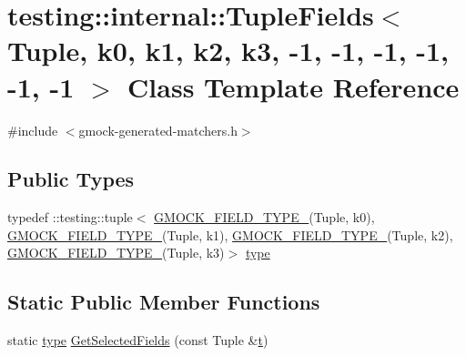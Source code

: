 \hypertarget{classtesting_1_1internal_1_1_tuple_fields_3_01_tuple_00_01k0_00_01k1_00_01k2_00_01k3_00_01-1_00_d404aa1c50b4758daf5bb2f78d0fb44c}{}\section{testing\+::internal\+::Tuple\+Fields$<$ Tuple, k0, k1, k2, k3, -\/1, -\/1, -\/1, -\/1, -\/1, -\/1 $>$ Class Template Reference}
\label{classtesting_1_1internal_1_1_tuple_fields_3_01_tuple_00_01k0_00_01k1_00_01k2_00_01k3_00_01-1_00_d404aa1c50b4758daf5bb2f78d0fb44c}


{\ttfamily \#include $<$gmock-\/generated-\/matchers.\+h$>$}

\subsection*{Public Types}
\begin{DoxyCompactItemize}
\item 
typedef \+::testing\+::tuple$<$ \mbox{\hyperlink{_obj__test_2lib_2googletest-release-1_88_81_2googlemock_2include_2gmock_2gmock-generated-matchers_8h_acf3e27de83a73f0d873da1cd471e505b}{G\+M\+O\+C\+K\+\_\+\+F\+I\+E\+L\+D\+\_\+\+T\+Y\+P\+E\+\_\+}}(Tuple, k0), \mbox{\hyperlink{_obj__test_2lib_2googletest-release-1_88_81_2googlemock_2include_2gmock_2gmock-generated-matchers_8h_acf3e27de83a73f0d873da1cd471e505b}{G\+M\+O\+C\+K\+\_\+\+F\+I\+E\+L\+D\+\_\+\+T\+Y\+P\+E\+\_\+}}(Tuple, k1), \mbox{\hyperlink{_obj__test_2lib_2googletest-release-1_88_81_2googlemock_2include_2gmock_2gmock-generated-matchers_8h_acf3e27de83a73f0d873da1cd471e505b}{G\+M\+O\+C\+K\+\_\+\+F\+I\+E\+L\+D\+\_\+\+T\+Y\+P\+E\+\_\+}}(Tuple, k2), \mbox{\hyperlink{_obj__test_2lib_2googletest-release-1_88_81_2googlemock_2include_2gmock_2gmock-generated-matchers_8h_acf3e27de83a73f0d873da1cd471e505b}{G\+M\+O\+C\+K\+\_\+\+F\+I\+E\+L\+D\+\_\+\+T\+Y\+P\+E\+\_\+}}(Tuple, k3)$>$ \mbox{\hyperlink{classtesting_1_1internal_1_1_tuple_fields_3_01_tuple_00_01k0_00_01k1_00_01k2_00_01k3_00_01-1_00_d404aa1c50b4758daf5bb2f78d0fb44c_a543de8075300fc9ee1b9f3494d492fb5}{type}}
\end{DoxyCompactItemize}
\subsection*{Static Public Member Functions}
\begin{DoxyCompactItemize}
\item 
static \mbox{\hyperlink{classtesting_1_1internal_1_1_tuple_fields_3_01_tuple_00_01k0_00_01k1_00_01k2_00_01k3_00_01-1_00_d404aa1c50b4758daf5bb2f78d0fb44c_a543de8075300fc9ee1b9f3494d492fb5}{type}} \mbox{\hyperlink{classtesting_1_1internal_1_1_tuple_fields_3_01_tuple_00_01k0_00_01k1_00_01k2_00_01k3_00_01-1_00_d404aa1c50b4758daf5bb2f78d0fb44c_ab425de0d7d5a7f13894b5e52ad8b553a}{Get\+Selected\+Fields}} (const Tuple \&\mbox{\hyperlink{_mutual_8h_a978d88b393c8a37dc2614c88788b3442}{t}})
\end{DoxyCompactItemize}


